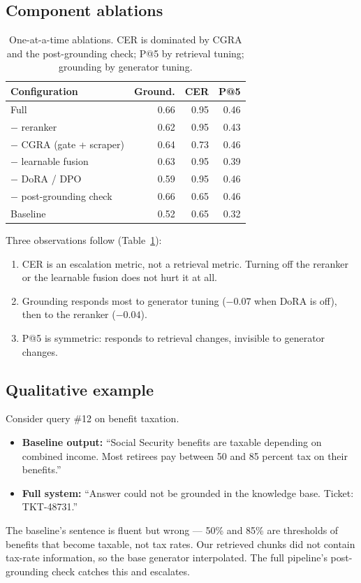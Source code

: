 \documentclass[11pt,a4paper]{article}
\begin{document}
\subsection{Component ablations}
\begin{table}[t]
\small
\centering
\begin{tabular}{lrrr}
\toprule
Configuration              & Ground. & CER  & P@5  \\
\midrule
Full                       & 0.66 & 0.95 & 0.46 \\
$-$ reranker               & 0.62 & 0.95 & 0.43 \\
$-$ CGRA (gate + scraper)  & 0.64 & 0.73 & 0.46 \\
$-$ learnable fusion       & 0.63 & 0.95 & 0.39 \\
$-$ DoRA / DPO             & 0.59 & 0.95 & 0.46 \\
$-$ post-grounding check   & 0.66 & 0.65 & 0.46 \\
Baseline                   & 0.52 & 0.65 & 0.32 \\
\bottomrule
\end{tabular}
\caption{One-at-a-time ablations. CER is dominated by CGRA and the post-grounding check; P@5 by retrieval tuning; grounding by generator tuning.}
\label{tab:ablation}
\end{table}

Three observations follow (Table~\ref{tab:ablation}):
\begin{enumerate}
\itemsep 1pt
\item CER is an escalation metric, not a retrieval metric. Turning off the reranker or the learnable fusion does not hurt it at all.
\item Grounding responds most to generator tuning ($-0.07$ when DoRA is off), then to the reranker ($-0.04$).
\item P@5 is symmetric: responds to retrieval changes, invisible to generator changes.
\end{enumerate}

\subsection{Qualitative example}
Consider query \#12 on benefit taxation.
\begin{itemize}
\itemsep 1pt
\item \textbf{Baseline output:} ``Social Security benefits are taxable depending on combined income. Most retirees pay between 50 and 85 percent tax on their benefits.''
\item \textbf{Full system:} ``Answer could not be grounded in the knowledge base. Ticket: TKT-48731.''
\end{itemize}
The baseline's sentence is fluent but wrong --- 50\% and 85\% are thresholds of benefits that become taxable, not tax rates. Our retrieved chunks did not contain tax-rate information, so the base generator interpolated. The full pipeline's post-grounding check catches this and escalates.
\end{document}

